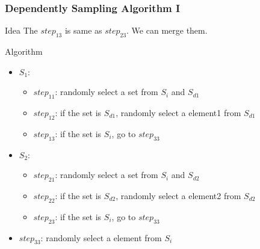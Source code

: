 \documentclass[notheorems, aspectratio=54]{beamer}
\begin{document}
\begin{frame}
    \frametitle{Dependently Sampling Algorithm I}
    \begin{block}{Idea}
        The $step_{13}$ is same as $step_{23}$. We can merge them.
    \end{block}
    \begin{block}{Algorithm}
        \begin{itemize}
            \item $S_1$:
            \begin{itemize}
                \item $step_{11}$: randomly select a set from $S_i$ and $S_{d1}$
                \item $step_{12}$: if the set is $S_{d1}$, randomly select a element1 from $S_{d1}$
                \item $step_{13}$: if the set is $S_i$, go to $step_{33}$
            \end{itemize}
            \item $S_2$:
            \begin{itemize}
                \item $step_{21}$: randomly select a set from $S_i$ and $S_{d2}$
                \item $step_{22}$: if the set is $S_{d2}$, randomly select a element2 from $S_{d2}$
                \item $step_{23}$: if the set is $S_i$, go to $step_{33}$
            \end{itemize}
            \item $step_{33}$: randomly select a element from $S_i$
        \end{itemize}
    \end{block}
\end{frame}
\end{document}

